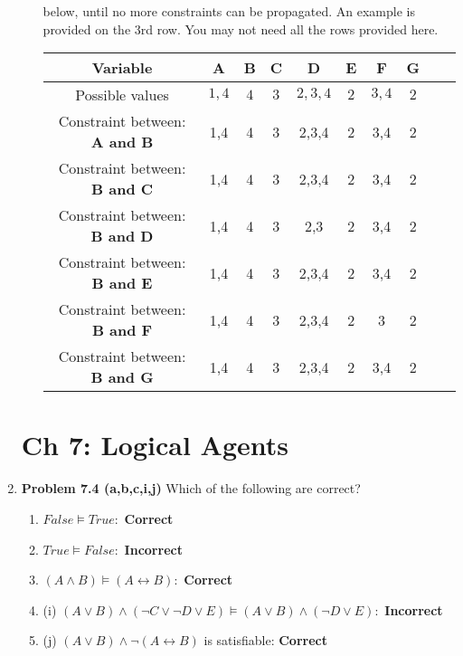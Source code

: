 \documentclass[10pt]{article}
\begin{document}
\begin{enumerate}
\begin{enumerate}
  below, until no more constraints can be propagated. An example is provided on the 3rd row.
  You may not need all the rows provided here.
  \begin{center}
    \begin{tabular}{|c|c|c|c|c|c|c|c|c|c|}
      \hline
      \textbf{Variable} & \textbf{A} & \textbf{B} & \textbf{C} & \textbf{D} & \textbf{E} & \textbf{F} & \textbf{G} \\
      \hline
      Possible values & $1,4$ & $4$ & $3$ & $2,3,4$ & $2$ & $3,4$ & $2$ \\
      \hline
      Constraint between: \textbf{A and B} & 1,4 & 4 & 3 & 2,3,4 & 2 & 3,4 & 2 \\
      \hline
      Constraint between: \textbf{B and C} & 1,4 & 4 & 3 & 2,3,4 & 2 & 3,4 & 2 \\
      \hline
      Constraint between: \textbf{B and D} & 1,4 & 4 & 3 & 2,3 & 2 & 3,4 & 2 \\
      \hline
      Constraint between: \textbf{B and E} & 1,4 & 4 & 3 & 2,3,4 & 2 & 3,4 & 2 \\
      \hline
      Constraint between: \textbf{B and F} & 1,4 & 4 & 3 & 2,3,4 & 2 & 3 & 2 \\
      \hline
      Constraint between: \textbf{B and G} & 1,4 & 4 & 3 & 2,3,4 & 2 & 3,4 & 2 \\
      \hline
      
    \end{tabular}
  \end{center}
\end{enumerate}

\section*{Ch 7: Logical Agents}

\item \textbf{Problem 7.4 (a,b,c,i,j)} Which of the following are correct?
  \begin{enumerate}
  \item $False \models True:$ \textbf{Correct} 
  \item $True \models False:$ \textbf{Incorrect}
  \item $(A \wedge B) \models (A \leftrightarrow B):$ \textbf{Correct}
  \item (i) $(A \lor B) \wedge (\lnot C \lor \lnot D \lor E) \models (A \lor B) \wedge (\lnot D \lor E):$ \textbf{Incorrect}
  \item (j) $(A \lor B) \wedge \lnot (A \leftrightarrow B)$ is satisfiable: \textbf{Correct}
  \end{enumerate}


\end{enumerate}
\end{document}
